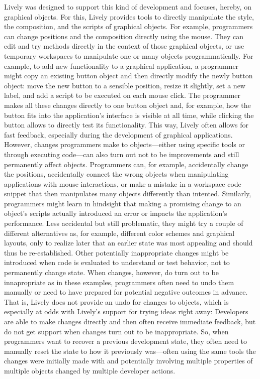 Lively was designed to support this kind of development and focuses, hereby, on graphical objects.
For this, Lively provides tools to directly manipulate the style, the composition, and the scripts of graphical objects.
For example, programmers can change positions and the composition directly using the mouse.
They can edit and try methods directly in the context of those graphical objects, or use temporary workspaces to manipulate one or many objects programmatically.
For example, to add new functionality to a graphical application, a programmer might copy an existing button object and then directly modify the newly button object: move the new button to a sensible position, resize it slightly, set a new label, and add a script to be executed on each mouse click.
The programmer makes all these changes directly to one button object and, for example, how the button fits into the application's interface is visible at all time, while clicking the button allows to directly test its functionality.
This way, Lively often allows for fast feedback, especially during the development of graphical applications.
However, changes programmers make to objects---either using specific tools or through executing code---can also turn out not to be improvements and still permanently affect objects.
Programmers can, for example, accidentally change the positions, accidentally connect the wrong objects when manipulating applications with mouse interactions, or make a mistake in a workspace code snippet that then manipulates many objects differently than intented.
Similarly, programmers might learn in hindsight that making a promising change to an object's scripts actually introduced an error or impacts the application's performance.
Less accidental but still problematic, they might try a couple of different alternatives as, for example, different color schemes and graphical layouts, only to realize later that an earlier state was most appealing and should thus be re-established.
Other potentially inappropriate changes might be introduced when code is evaluated to understand or test behavior, not to permanently change state.
When changes, however, do turn out to be innapropriate as in these examples, programmers often need to undo them manually or need to have prepared for potential negative outcomes in advance.
That is, Lively does not provide an undo for changes to objects, which is especially at odds with Lively's support for trying ideas right away: Developers are able to make changes directly and then often receive immediate feedback, but do not get support when changes turn out to be inappropriate.
So, when programmers want to recover a previous development state, they often need to manually reset the state to how it previously was---often using the same tools the changes were initially made with and potentially involving multiple properties of multiple objects changed by multiple developer actions.

